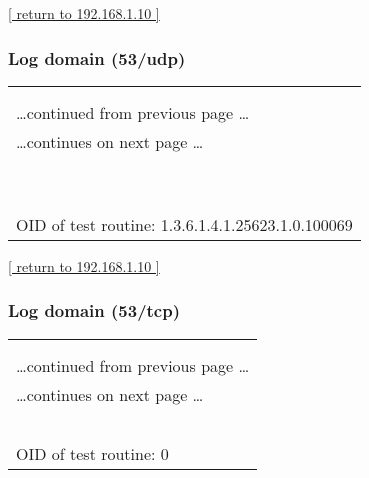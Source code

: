 \documentclass{article}
\begin{document}
\begin{footnotesize}\hyperref[host:192.168.1.10]{[ return to 192.168.1.10 ]}\end{footnotesize}
\subsubsection{Log domain (53/udp)}
\label{port:192.168.1.10 domain (53/udp) Log}

\begin{longtable}{|p{}|}
\hline
\rowcolor{openvas_log}{\color{white}{Log (CVSS: 0.0) }}\\
\rowcolor{openvas_log}{\color{white}{NVT: DNS Server Detection}}\\
\hline
\endfirsthead
\hfill\ldots continued from previous page \ldots \\
\hline
\endhead
\hline
\ldots continues on next page \ldots \\
\endfoot
\hline
\endlastfoot
\\
\rowcolor{white}{\verb= Summary:=}\\
\rowcolor{white}{\verb= A DNS Server is running at this Host.=}\\
\rowcolor{white}{\verb=A Name Server translates domain names into IP addresses. This makes it=}\\
\rowcolor{white}{\verb=possible for a user to access a website by typing in the domain name instead of=}\\
\rowcolor{white}{\verb=the website's actual IP address.=}\\
\rowcolor{white}{\verb==}\\
\rowcolor{white}{\verb==}\\
\\
OID of test routine: 1.3.6.1.4.1.25623.1.0.100069\\
\end{longtable}

\begin{footnotesize}\hyperref[host:192.168.1.10]{[ return to 192.168.1.10 ]}\end{footnotesize}
\subsubsection{Log domain (53/tcp)}
\label{port:192.168.1.10 domain (53/tcp) Log}

\begin{longtable}{|p{}|}
\hline
\rowcolor{openvas_log}{\color{white}{Log}}\\
\rowcolor{openvas_log}{\color{white}{NVT: }}\\
\hline
\endfirsthead
\hfill\ldots continued from previous page \ldots \\
\hline
\endhead
\hline
\ldots continues on next page \ldots \\
\endfoot
\hline
\endlastfoot
\\
\rowcolor{white}{\verb=Open port.=}\\
\rowcolor{white}{\verb==}\\
\rowcolor{white}{\verb==}\\
\\
OID of test routine: 0\\
\end{longtable}
\end{document}
